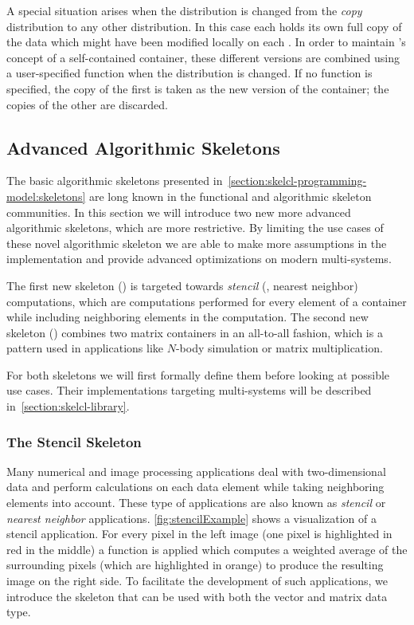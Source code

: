 A special situation arises when the distribution is changed from the \emph{copy} distribution to any other distribution.
In this case each \GPU holds its own full copy of the data which might have been modified locally on each \GPU.
In order to maintain \SkelCL's concept of a self-contained container, these different versions are combined using a user-specified function when the distribution is changed.
If no function is specified, the copy of the first \GPU is taken as the new version of the container; the copies of the other \GPUs are discarded.


\subsection{Advanced Algorithmic Skeletons}
\label{section:skelcl-programming-model:specialSkeletons}

The basic algorithmic skeletons presented in~\autoref{section:skelcl-programming-model:skeletons} are long known in the functional and algorithmic skeleton communities.
In this section we will introduce two new more advanced algorithmic skeletons, which are more restrictive.
By limiting the use cases of these novel algorithmic skeleton we are able to make more assumptions in the implementation and provide advanced optimizations on modern multi-\GPU systems.

The first new skeleton (\stencil) is targeted towards \emph{stencil} (\aka, nearest neighbor) computations, which are computations performed for every element of a container while including neighboring elements in the computation.
The second new skeleton (\allpairs) combines two matrix containers in an all-to-all fashion, which is a pattern used in applications like $N$-body simulation or matrix multiplication.

For both skeletons we will first formally define them before looking at possible use cases.
Their implementations targeting multi-\GPU systems will be described in~\autoref{section:skelcl-library}.


\subsubsection{The Stencil Skeleton}
\label{section:stencil:skeleton}

Many numerical and image processing applications deal with two-dimensional data and perform calculations on each data element while taking neighboring elements into account.
These type of applications are also known as \emph{stencil} or \emph{nearest neighbor} applications.
\autoref{fig:stencilExample} shows a visualization of a stencil application.
For every pixel in the left image (one pixel is highlighted in red in the middle) a function is applied which computes a weighted average of the surrounding pixels (which are highlighted in orange) to produce the resulting image on the right side.
To facilitate the development of such applications, we introduce the \stencil skeleton that can be used with both the vector and matrix data type.

